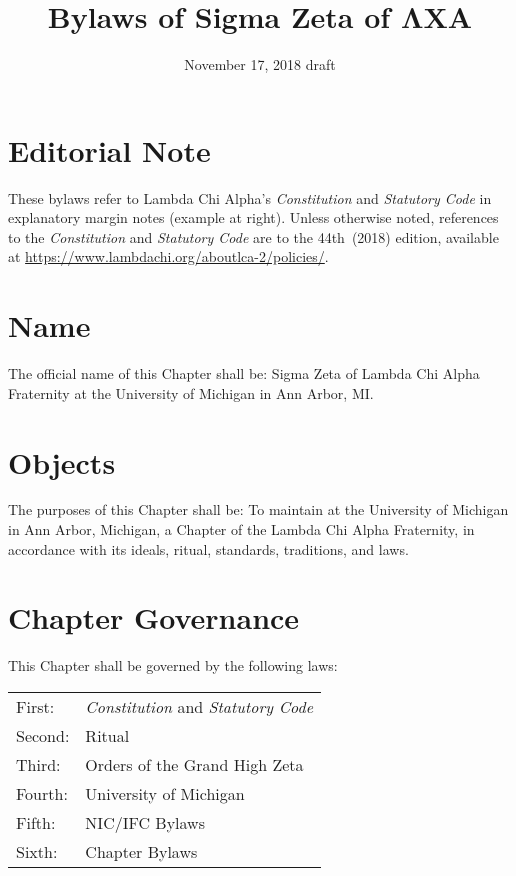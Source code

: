\documentclass{article}
\title{Bylaws of Sigma Zeta of ΛΧΑ}
\date{November 17, 2018 draft}
\begin{document}
\maketitle

\section*{Editorial Note}

These bylaws refer to Lambda Chi Alpha’s \emph{Constitution} and \emph{Statutory
Code} in explanatory margin notes  (example
at right). Unless otherwise noted, references to the \emph{Constitution} and
\emph{Statutory Code} are to the 44th~(2018) edition, available at
\url{https://www.lambdachi.org/aboutlca-2/policies/}.

\section{Name}

The official name of this Chapter shall be: Sigma Zeta  of Lambda Chi Alpha Fraternity at the University
of Michigan in Ann Arbor, MI.

\section{Objects}

The purposes of this Chapter shall be: To maintain at the University of Michigan
in Ann Arbor, Michigan, a Chapter of the Lambda Chi Alpha Fraternity, in
accordance with its ideals, ritual, standards, traditions, and laws.

\section{Chapter Governance}

This Chapter shall be governed by the following laws:

\hspace*{-\tabcolsep}%
\begin{tabular}{ll}
  First:  & \emph{Constitution} and \emph{Statutory Code} \\
  Second: & Ritual                                        \\
  Third:  & Orders of the Grand High Zeta                 \\
  Fourth: & University of Michigan                        \\
  Fifth:  & NIC/IFC Bylaws                                \\
  Sixth:  & Chapter Bylaws                                \\
\end{tabular}
\end{document}
